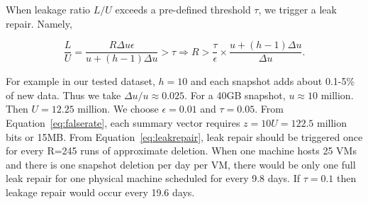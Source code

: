 When leakage ratio $L/U$ exceeds a pre-defined threshold $\tau$, we trigger a leak repair. Namely,

\begin{equation}
\label{eq:leakrepair}
\frac{L}{U} = \frac{R \Delta u \epsilon}{u+(h-1)\Delta u } > \tau 
\Longrightarrow R > \frac{\tau}{\epsilon}\times\frac{u + (h-1)\Delta u}{\Delta u}.
\end{equation}

For example in our tested dataset,  
$h=10$ and each snapshot adds
about 0.1-5\% of new data. Thus we take ${\Delta u}/{u} \approx 0.025$. For a 40GB snapshot, $u\approx  10$ million.
Then $U=12.25$ million.
We choose  $\epsilon = 0.01$ and $\tau=0.05$.  From Equation~\ref{eq:falserate}, 
each summary vector requires $z=10U=122.5$ million bits or 15MB. From Equation~\ref{eq:leakrepair}, 
leak repair should be triggered once for every R=245 runs of approximate deletion. 
When one machine hosts 25 VMs and there is one snapshot deletion per day per VM, there would be 
only one full leak repair for one physical machine scheduled for every 9.8 days. 
If $\tau = 0.1$ then leakage repair would occur every 19.6 days.

